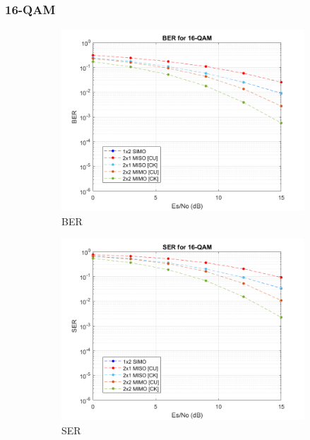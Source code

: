 \documentclass{article}
\begin{document}
\subsubsection{16-QAM}
\begin{figure}[H]
	\centering
	\begin{subfigure}{0.5\textwidth}
		\centerline{\includegraphics[width=1\textwidth]{16qamber.png}}
		\caption{BER}
	\end{subfigure}%
	\begin{subfigure}{0.5\textwidth}
		\centerline{\includegraphics[width=1\textwidth]{16qamser.png}}
		\caption{SER}
	\end{subfigure}\\%
	\begin{subfigure}{0.5\textwidth}

\end{subfigure}
\end{figure}
\end{document}
